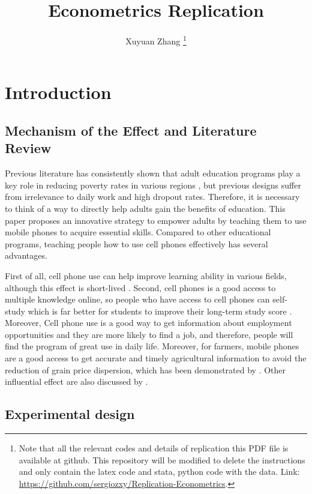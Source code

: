 \documentclass[12pt]{jfm}
\title{Econometrics Replication}
\author{Xuyuan Zhang\aff{1}
  \corresp{\email{\href{mailto:zxuyuan@umich.edu}{zxuyuan@umich.edu}}}
  \thanks{Note that all the relevant codes and details of replication this PDF file is available at github. This repository will be modified to delete the instructions and only contain the latex code and stata, python code with the data. Link: \href{https://github.com/sergiozxy/Replication-Econometrics}{https://github.com/sergiozxy/Replication-Econometrics}.}
  }
\affiliation{\aff{1}Department of Economics, University of Michigan, Ann Arbor, USA.}
\begin{document}
\maketitle

\section{Introduction} \label{sec:introduction}

\subsection{Mechanism of the Effect and Literature Review} \label{subsec:literature}

Previous literature has consistently shown that adult education programs play a key role in reducing poverty rates in various regions \citep{RePEc:wbk:wboper:9767, doi:10.1086/590461}, but previous designs suffer from irrelevance to daily work and high dropout rates. Therefore, it is necessary to think of a way to directly help adults gain the benefits of education. This paper proposes an innovative strategy to empower adults by teaching them to use mobile phones to acquire essential skills. Compared to other educational programs, teaching people how to use cell phones effectively has several advantages.

First of all, cell phone use can help improve learning ability in various fields, although this effect is short-lived \citep{10.1257/pol.1.1.52}. Second, cell phones is a good access to multiple knowledge online, so people who have access to cell phones can self-study which is far better for students to improve their long-term study score \citep{SEETO20121484}.  Moreover, Cell phone use is a good way to get information about employment opportunities and they are more likely to find a job\citep{GrzybowskiPatel+2023+85+114}, and therefore, people will find the program of great use in daily life. Moreover, for farmers, mobile phones are a good access to get accurate and timely agricultural information to avoid the reduction of grain price dispersion, which has been demonstrated by \citep{10.1257/app.2.3.46}. Other influential effect are also discussed by \citep{GONZALEZ2024103228, 10.1257/jep.24.3.207, CHENG2015109}.

\subsection{Experimental design} \label{subsec:design}
\end{document}
